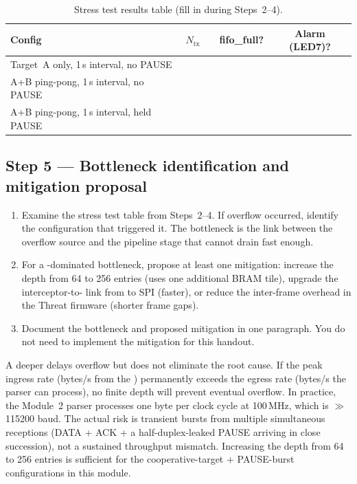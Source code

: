 \documentclass[11pt,letterpaper]{article}
\begin{document}
\begin{table}[h!]
	\centering
	\caption{Stress test results table (fill in during Steps~2--4).}
	\renewcommand{\arraystretch}{1.4}
	\begin{tabularx}{\textwidth}{X c c c c}
		\toprule
		\textbf{Config} & \textbf{$N_{\text{tx}}$} & \textbf{\PER{}} & \textbf{fifo\_full?} & \textbf{Alarm (LED7)?} \\
		\midrule
		Target~A only, 1\,s interval, no PAUSE        & & & & \\
		A+B ping-pong, 1\,s interval, no PAUSE        & & & & \\
		A+B ping-pong, 1\,s interval, held PAUSE      & & & & \\
		\bottomrule
	\end{tabularx}
\end{table}

\subsection{Step 5 --- Bottleneck identification and mitigation proposal}
\begin{enumerate}[leftmargin=2em]
	\item Examine the stress test table from Steps~2--4. If \FIFO{} overflow occurred, identify the configuration that triggered it. The bottleneck is the link between the overflow source and the pipeline stage that cannot drain fast enough.
	\item For a \FIFO{}-dominated bottleneck, propose at least one mitigation: increase the \FIFO{} depth from 64 to 256 entries (uses one additional \mbox{BRAM} tile), upgrade the interceptor-to-\FPGA{} link from \UART{} to \mbox{SPI} (faster), or reduce the inter-frame overhead in the Threat firmware (shorter frame gaps).
	\item Document the bottleneck and proposed mitigation in one paragraph. You do not need to implement the mitigation for this handout.
\end{enumerate}

\begin{tcolorbox}[infobox={Why Not Just Increase the FIFO Depth?}]
	A deeper \FIFO{} delays overflow but does not eliminate the root cause. If the peak ingress rate (bytes/s from the \UART{}) permanently exceeds the egress rate (bytes/s the parser can process), no finite \FIFO{} depth will prevent eventual overflow. In practice, the Module~2 parser processes one byte per clock cycle at 100\,MHz, which is $\gg$115200 baud. The actual risk is transient bursts from multiple simultaneous receptions (DATA + ACK + a half-duplex-leaked PAUSE arriving in close succession), not a sustained throughput mismatch. Increasing the \FIFO{} depth from 64 to 256 entries is sufficient for the cooperative-target + PAUSE-burst configurations in this module.
\end{tcolorbox}
\end{document}
